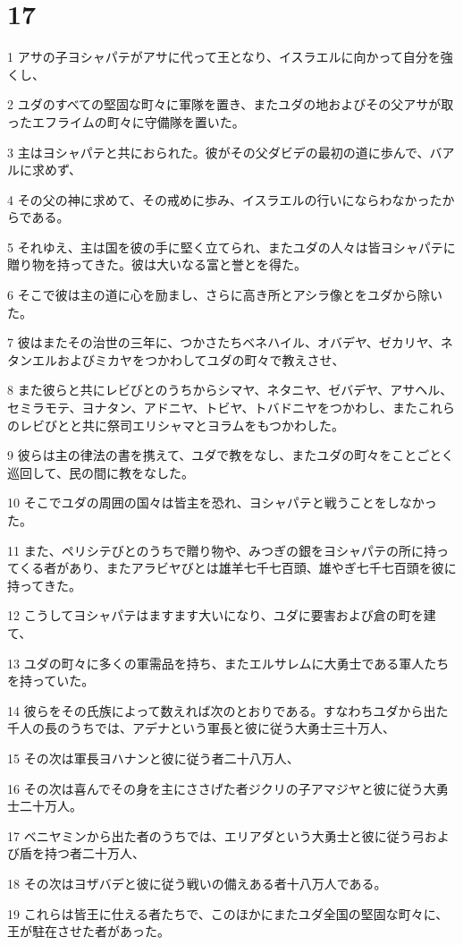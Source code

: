 \chapter{17}

\par 1 アサの子ヨシャパテがアサに代って王となり、イスラエルに向かって自分を強くし、
\par 2 ユダのすべての堅固な町々に軍隊を置き、またユダの地およびその父アサが取ったエフライムの町々に守備隊を置いた。
\par 3 主はヨシャパテと共におられた。彼がその父ダビデの最初の道に歩んで、バアルに求めず、
\par 4 その父の神に求めて、その戒めに歩み、イスラエルの行いにならわなかったからである。
\par 5 それゆえ、主は国を彼の手に堅く立てられ、またユダの人々は皆ヨシャパテに贈り物を持ってきた。彼は大いなる富と誉とを得た。
\par 6 そこで彼は主の道に心を励まし、さらに高き所とアシラ像とをユダから除いた。
\par 7 彼はまたその治世の三年に、つかさたちベネハイル、オバデヤ、ゼカリヤ、ネタンエルおよびミカヤをつかわしてユダの町々で教えさせ、
\par 8 また彼らと共にレビびとのうちからシマヤ、ネタニヤ、ゼバデヤ、アサヘル、セミラモテ、ヨナタン、アドニヤ、トビヤ、トバドニヤをつかわし、またこれらのレビびとと共に祭司エリシャマとヨラムをもつかわした。
\par 9 彼らは主の律法の書を携えて、ユダで教をなし、またユダの町々をことごとく巡回して、民の間に教をなした。
\par 10 そこでユダの周囲の国々は皆主を恐れ、ヨシャパテと戦うことをしなかった。
\par 11 また、ペリシテびとのうちで贈り物や、みつぎの銀をヨシャパテの所に持ってくる者があり、またアラビヤびとは雄羊七千七百頭、雄やぎ七千七百頭を彼に持ってきた。
\par 12 こうしてヨシャパテはますます大いになり、ユダに要害および倉の町を建て、
\par 13 ユダの町々に多くの軍需品を持ち、またエルサレムに大勇士である軍人たちを持っていた。
\par 14 彼らをその氏族によって数えれば次のとおりである。すなわちユダから出た千人の長のうちでは、アデナという軍長と彼に従う大勇士三十万人、
\par 15 その次は軍長ヨハナンと彼に従う者二十八万人、
\par 16 その次は喜んでその身を主にささげた者ジクリの子アマジヤと彼に従う大勇士二十万人。
\par 17 ベニヤミンから出た者のうちでは、エリアダという大勇士と彼に従う弓および盾を持つ者二十万人、
\par 18 その次はヨザバデと彼に従う戦いの備えある者十八万人である。
\par 19 これらは皆王に仕える者たちで、このほかにまたユダ全国の堅固な町々に、王が駐在させた者があった。

